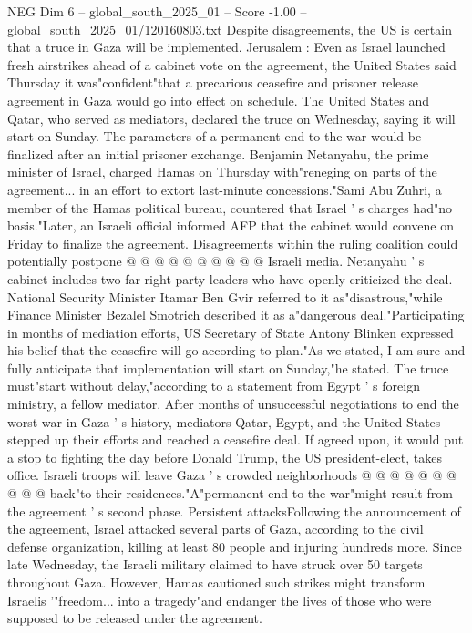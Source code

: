 \begin{textsample}{NEG Dim 6 – global\_south\_2025\_01 – Score -1.00 – global\_south\_2025\_01/120160803.txt}  \label{ex:f6_neg_092}
Despite disagreements, the US is certain that a truce in Gaza will be implemented.
Jerusalem : Even as Israel launched fresh airstrikes ahead of a cabinet vote on the agreement, the United States said Thursday it was"confident"that a precarious ceasefire and prisoner release agreement in Gaza would go into effect on schedule.
The United States and Qatar, who served as mediators, declared the truce on Wednesday, saying it will start on Sunday.
The parameters of a permanent end to the war would be finalized after an initial prisoner exchange.
Benjamin Netanyahu, the prime minister of Israel, charged Hamas on Thursday with"reneging on parts of the agreement... in an effort to extort last-minute concessions."Sami Abu Zuhri, a member of the Hamas political bureau, countered that Israel ' s charges had"no basis."Later, an Israeli official informed AFP that the cabinet would convene on Friday to finalize the agreement.
Disagreements within the ruling coalition could potentially postpone @ @ @ @ @ @ @ @ @ @ Israeli media.
Netanyahu ' s cabinet includes two far-right party leaders who have openly criticized the deal.
National Security Minister Itamar Ben Gvir referred to it as"disastrous,"while Finance Minister Bezalel Smotrich described it as a"dangerous deal."Participating in months of mediation efforts, US Secretary of State Antony Blinken expressed his belief that the ceasefire will go according to plan."As we stated, I am sure and fully anticipate that implementation will start on Sunday,"he stated.
The truce must"start without delay,"according to a statement from Egypt ' s foreign ministry, a fellow mediator.
After months of unsuccessful negotiations to end the worst war in Gaza ' s history, mediators Qatar, Egypt, and the United States stepped up their efforts and reached a ceasefire deal.
If agreed upon, it would put a stop to fighting the day before Donald Trump, the US president-elect, takes office.
Israeli troops will leave Gaza ' s crowded neighborhoods @ @ @ @ @ @ @ @ @ @ back"to their residences."A"permanent end to the war"might result from the agreement ' s second phase.
Persistent attacksFollowing the announcement of the agreement, Israel attacked several parts of Gaza, according to the civil defense organization, killing at least 80 people and injuring hundreds more.
Since late Wednesday, the Israeli military claimed to have struck over 50 targets throughout Gaza.
However, Hamas cautioned such strikes might transform Israelis '"freedom... into a tragedy"and endanger the lives of those who were supposed to be released under the agreement.

\end{textsample}
